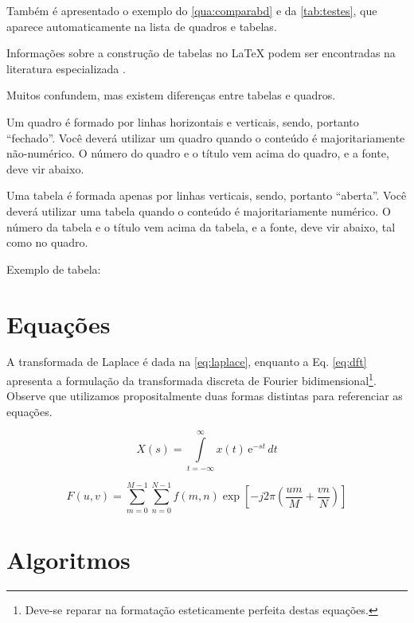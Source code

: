 \begin{apendicesenv}
Também é apresentado o exemplo do \autoref{qua:comparabd} e da
\autoref{tab:testes}, que aparece automaticamente na lista de quadros e tabelas.

Informações sobre a construção de tabelas no \LaTeX{} podem ser encontradas na
literatura especializada \cite{Lamport1986,Buerger1989,Kopka2003,Mittelbach2004}.



Muitos confundem, mas existem diferenças entre tabelas e quadros.

Um quadro é formado por linhas horizontais e verticais, sendo, portanto
``fechado''. Você deverá utilizar um quadro quando o conteúdo é majoritariamente
não-numérico. O número do quadro e o título vem acima do quadro, e a fonte,
deve vir abaixo.

Uma tabela é formada apenas por linhas verticais, sendo, portanto ``aberta''.
Você deverá utilizar uma tabela quando o conteúdo é majoritariamente numérico.
O número da tabela e o título vem acima da tabela, e a fonte, deve vir abaixo,
tal como no quadro.

Exemplo de tabela:



\section{Equações}
\label{sec:equacoes}

A transformada de Laplace é dada na \autoref{eq:laplace}, enquanto a Eq.
\ref{eq:dft} apresenta a formulação da transformada discreta de Fourier
bidimensional\footnote{Deve-se reparar na formatação esteticamente perfeita
destas equações.}. Observe que utilizamos propositalmente duas formas distintas
para referenciar as equações.

\begin{equation}
    X(s) = \int\limits_{t = -\infty}^{\infty} x(t) \, \text{e}^{-st} \, dt
    \label{eq:laplace}
\end{equation}

\begin{equation}
    F(u, v) = \sum_{m = 0}^{M - 1} \sum_{n = 0}^{N - 1} f(m, n) \exp \left[ -j 2 \pi \left( \frac{u m}{M} + \frac{v n}{N} \right) \right]
    \label{eq:dft}
\end{equation}

\section{Algoritmos}\label{sec:algoritmos}


\end{apendicesenv}
